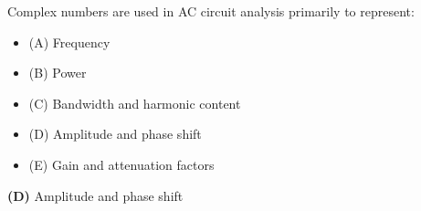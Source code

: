 

Complex numbers are used in AC circuit analysis primarily to represent:

\begin{itemize}
\item{(A)} Frequency
\vskip 5pt 
\item{(B)} Power
\vskip 5pt 
\item{(C)} Bandwidth and harmonic content
\vskip 5pt 
\item{(D)} Amplitude and phase shift
\vskip 5pt 
\item{(E)} Gain and attenuation factors
\end{itemize}







{\bf (D)} Amplitude and phase shift
 










